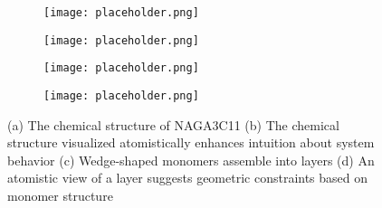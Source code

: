 \begin{figure}
\centering
\begin{subfigure}{.45\linewidth}
	\centering
        \texttt{[image: placeholder.png]}
        \caption{}\label{fig:chemdraw}
\end{subfigure}
\begin{subfigure}{.45\linewidth}
	\centering
        \texttt{[image: placeholder.png]}
        \caption{}\label{fig:monatomistic}
\end{subfigure}
\medskip
\begin{subfigure}{.45\linewidth}
	\centering
        \texttt{[image: placeholder.png]}
        \caption{}\label{fig:cartoonlayer}
\end{subfigure}
\begin{subfigure}{.45\linewidth}
	\centering
        \texttt{[image: placeholder.png]}
        \caption{}\label{fig:layeratomistic}
\end{subfigure}
\caption{(a) The chemical structure of NAGA3C11 (b) The chemical 
structure visualized atomistically enhances intuition about system
behavior (c) Wedge-shaped monomers assemble into layers (d) An atomistic
view of a layer suggests geometric constraints based on monomer
structure}\label{fig:cartoonvatomistic}
\end{figure}

